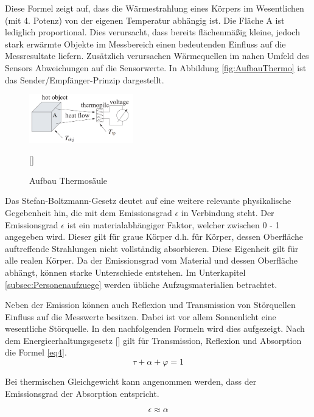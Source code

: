 Diese Formel zeigt auf, dass die Wärmestrahlung eines Körpers im Wesentlichen (mit 4. Potenz) von der eigenen Temperatur abhängig ist. 
Die Fläche A ist lediglich proportional. Dies verursacht, dass bereits flächenmäßig kleine, jedoch stark erwärmte Objekte im Messbereich einen bedeutenden Einfluss auf die Messresultate liefern. Zusätzlich verursachen Wärmequellen im nahen Umfeld des Sensors Abweichungen auf die Sensorwerte. In Abbildung \ref{fig:AufbauThermo} ist das Sender/Empfänger-Prinzip dargestellt.

\begin{figure}[H]
	\centering
	\includegraphics[width=0.4\textwidth]
	{fig/seebeck2.PNG}
	\caption[Aufbau Thermosäule]{Aufbau Thermosäule} [\protect\cite{seebeck}]
	\label{fig:thermosäule}
\end{figure}


Das Stefan-Boltzmann-Gesetz deutet auf eine weitere relevante physikalische Gegebenheit hin, die mit dem Emissionsgrad $\epsilon$  in Verbindung steht.
 Der Emissionsgrad $\epsilon$ ist ein materialabhängiger Faktor, welcher zwischen 0 - 1  angegeben wird. Dieser gilt für graue Körper d.h. für Körper, dessen Oberfläche auftreffende Strahlungen nicht vollständig absorbieren. Diese Eigenheit gilt für alle realen Körper. Da der Emissionsgrad vom Material und dessen Oberfläche abhängt, können starke Unterschiede entstehen. Im Unterkapitel \ref{subsec:Personenaufzuege} werden übliche Aufzugsmaterialien betrachtet.

Neben der Emission können auch Reflexion und Transmission von Störquellen Einfluss auf die Messwerte besitzen. Dabei ist vor allem Sonnenlicht eine wesentliche Störquelle. In den nachfolgenden Formeln wird dies aufgezeigt. Nach dem Energieerhaltungsgesetz [\protect\cite{Thermoformeln}] gilt für Transmission, Reflexion und Absorption die Formel \ref{eq4}.
\begin{equation}
\label{eq4}
\tau  + \alpha + \varphi  = 1
\end{equation}

Bei thermischen Gleichgewicht kann angenommen werden, dass der Emissionsgrad der Absorption entspricht.

\begin{equation}
\label{eq5}
\epsilon \approx  \alpha
\end{equation}

